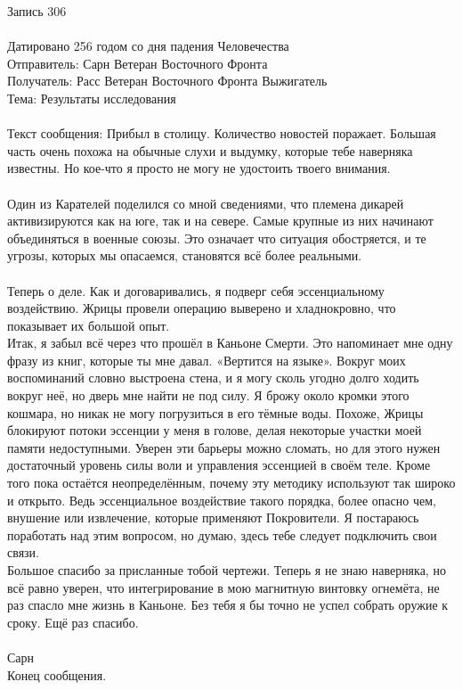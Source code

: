 \begin{mssg}{Запись 306\\
\\
Датировано 256 годом со дня падения Человечества\\
Отправитель: Сарн Ветеран Восточного Фронта\\
Получатель: Расс Ветеран Восточного Фронта Выжигатель\\
Тема: Результаты исследования\\
\\
Текст сообщения:
}%
Прибыл в столицу. Количество новостей поражает. Большая часть очень похожа на 
обычные слухи и выдумку, которые тебе наверняка известны. Но кое-что я просто не 
могу не удостоить твоего внимания.\\
\\
Один из Карателей поделился со мной сведениями, что племена дикарей 
активизируются как на юге, так и на севере. Самые крупные из них начинают 
объединяться в военные союзы. Это означает что ситуация обостряется, и те 
угрозы, которых мы опасаемся, становятся всё более реальными.\\
\\
Теперь о деле. Как и договаривались, я подверг себя эссенциальному 
воздействию. Жрицы провели операцию выверено и хладнокровно, что показывает их 
большой опыт.\\
Итак, я забыл всё через что прошёл в Каньоне Смерти. Это напоминает мне одну 
фразу из книг, которые ты мне давал. «Вертится на языке». Вокруг моих 
воспоминаний словно выстроена стена, и я могу сколь угодно долго ходить вокруг 
неё, но дверь мне найти не под силу. Я брожу около кромки этого кошмара, но 
никак не могу погрузиться в его тёмные воды. Похоже, Жрицы блокируют потоки 
эссенции у меня в голове, делая некоторые участки моей памяти недоступными. 
Уверен эти барьеры можно сломать, но для этого нужен достаточный уровень силы 
воли и управления эссенцией в своём теле. Кроме того пока остаётся 
неопределённым, почему эту методику используют так широко и открыто. Ведь 
эссенциальное воздействие такого порядка, более опасно чем, внушение или 
извлечение, которые применяют Покровители. Я постараюсь поработать над этим 
вопросом, но думаю, здесь тебе следует подключить свои связи.
\\
Большое спасибо за присланные тобой чертежи. Теперь я не знаю наверняка, но всё 
равно уверен, что интегрирование в мою магнитную винтовку огнемёта, не раз 
спасло мне жизнь в Каньоне. Без тебя я бы точно не успел собрать оружие к сроку. 
Ещё раз спасибо.\\
\\
Сарн\\
Конец сообщения.
\end{mssg}

